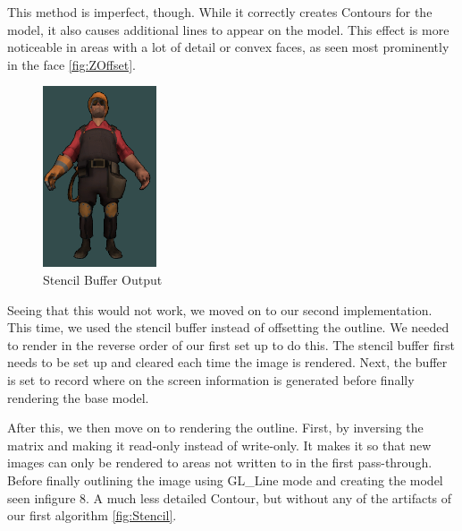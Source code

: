 This method is imperfect, though. While it correctly creates Contours for the model, it also causes 
additional lines to appear on the model. This effect is more noticeable in areas with a lot of detail or 
convex faces, as seen most prominently in the face \autoref{fig:ZOffset}.

\begin{figure}[h]
    \centering
    \includegraphics[width=0.3\textwidth]{img/ModelD.png}
    \caption{Stencil Buffer Output}
    \label{fig:Stencil}
\end{figure}

Seeing that this would not work, we moved on to our second implementation. This time, we used the stencil 
buffer instead of offsetting the outline. We needed to render in the reverse order of our first set up to 
do this. The stencil buffer first needs to be set up and cleared each time the image is rendered. Next, 
the buffer is set to record where on the screen information is generated before finally rendering the base model.

After this, we then move on to rendering the outline. First, by inversing the matrix and making it read-only 
instead of write-only. It makes it so that new images can only be rendered to areas not written to in the 
first pass-through. Before finally outlining the image using GL\_Line mode and creating the model seen infigure 
8. A much less detailed Contour, but without any of the artifacts of our first algorithm \autoref{fig:Stencil}.

\newpage
{}

